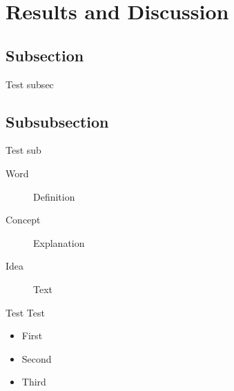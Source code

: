 \documentclass[10pt, 
a4paper, 
oneside, 
headinclude, footinclude, 
BCOR5mm]
{scrartcl}
\begin{document}
\section{Results and Discussion}

\subsection{Subsection}
Test subsec

\subsection{Subsubsection}
Test sub

\begin{description}
    \item[Word] Definition
    \item[Concept] Explanation
    \item[Idea] Text
\end{description}

Test Test

\begin{itemize}[noitemsep]
    \item First
    \item Second
    \item Third
\end{itemize}
\end{document}
